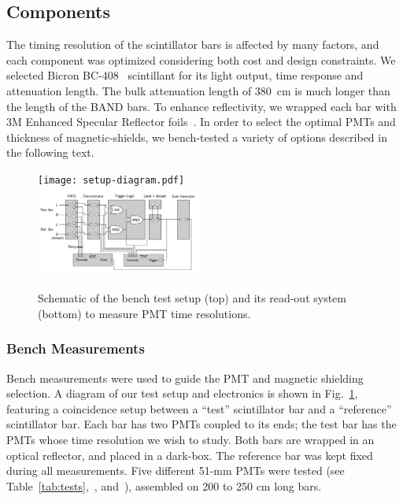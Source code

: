 \documentclass[3p,twocolumn]{elsarticle}
\begin{document}
\subsection{Components}
The timing resolution of the scintillator bars is affected by many
factors, and each component was optimized considering both cost and
 design constraints.
We selected Bicron BC-408~\cite{scint-mat-ref} scintillant for its
light output, time response and attenuation length. 
The bulk attenuation length of 380~\si{\centi\meter} is much longer
than the length of the BAND bars. To enhance reflectivity, we wrapped
each bar with 3M Enhanced Specular Reflector foils~\cite{3MESR}. 
In order to select the optimal PMTs and thickness of magnetic-shields, we 
bench-tested a variety of options described in the following text.


\begin{figure}[tb]
	\centering
		\texttt{[image: setup-diagram.pdf]} \\
		\includegraphics[width=0.48\textwidth]{electr_setup.png}
	\caption{Schematic of the bench test setup (top) and its
          read-out system (bottom) to measure PMT time resolutions. }
	\label{fig:test_stand_setup}
\end{figure}

\subsubsection{Bench Measurements}

Bench measurements were used to guide the PMT and magnetic shielding
selection.  A diagram of our test setup and electronics is shown in
Fig.~\ref{fig:test_stand_setup}, featuring a coincidence setup between
a ``test'' scintillator bar and a ``reference'' scintillator bar.  Each
bar has two PMTs coupled to its ends; the test bar has the PMTs whose
time resolution we wish to study.  Both bars are wrapped in an optical
reflector, and placed in a dark-box.  The reference bar was kept fixed
during all measurements. Five different 51-\si{\milli\meter} PMTs were tested (see Table~\ref{tab:tests},~\cite{hamapmts}, and~\cite{pmt9214}), assembled on 200 to 250
\si{\centi\meter} long bars.
\end{document}
